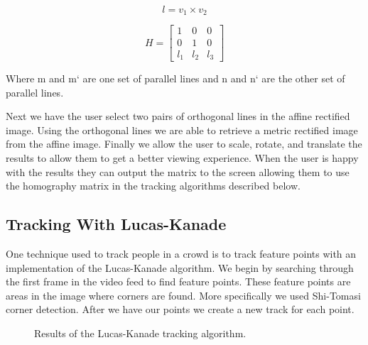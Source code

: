 \documentclass[12pt, onecolumn, conference]{IEEEtran}
\begin{document}
\begin{equation}
l = v_1 \times v_2
\end{equation}

\begin{equation}
H =
\begin{bmatrix}
1 & 0 & 0\\ 
0 & 1 & 0\\ 
l_1 & l_2 & l_3 
\end{bmatrix}
\end{equation}

Where m and m` are one set of parallel lines and n  and n` are the other set of parallel lines.

Next we have the user select two pairs of orthogonal lines in the affine rectified image. Using the orthogonal lines we are able to retrieve a metric rectified image from the affine image. Finally we allow the user to scale, rotate, and translate the results to allow them to get a better viewing experience. When the user is happy with the results they can output the matrix to the screen allowing them to use the homography matrix in the tracking algorithms described below.

\subsection{Tracking With Lucas-Kanade}

One technique used to track people in a crowd is to track feature points with an implementation of the  Lucas-Kanade algorithm. We begin by searching through the first frame in the video feed to find feature points. These feature points are areas in the image where corners are found. More specifically we used Shi-Tomasi corner detection. After we have our points we create a new track for each point.

\begin{figure}[!t]
\centering
{}
\caption{Results of the Lucas-Kanade tracking algorithm.}
\label{LK Tracking}
\end{figure}
\end{document}
